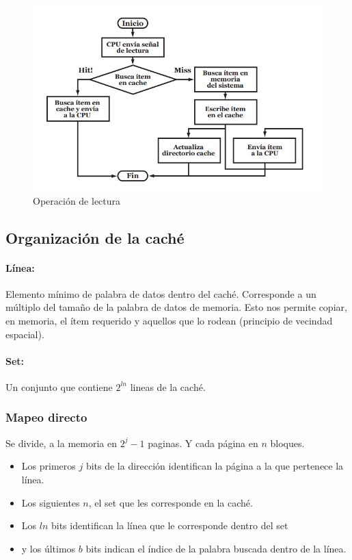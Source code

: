 \begin{figure}[ht]
	\centering
	\includegraphics[width=1\textwidth]{imagenes/cache}
	\caption{Operación de lectura}
	\label{fig:reading-operation}
\end{figure}

\subsection{Organización de la caché}

\paragraph{Línea:} Elemento mínimo de palabra de datos dentro del caché. Corresponde a un múltiplo del tamaño de la palabra de datos de memoria. Esto nos permite copiar, en memoria, el ítem requerido y aquellos que lo rodean (principio de vecindad espacial).

\paragraph{Set:} Un conjunto que contiene $2^{ln}$ lineas de la caché.

\subsubsection{Mapeo directo}
Se divide, a la memoria en $2^j - 1$ paginas. Y cada página en $n$ bloques.

\begin{itemize}
	\item Los primeros $j$ bits de la dirección identifican la página a la que pertenece la línea.
	\item Los siguientes $n$, el set que les corresponde en la caché.
	\item Los $ln$ bits identifican la línea que le corresponde dentro del set
	\item y los últimos $b$ bits indican el índice de la palabra buscada dentro de la línea.
\end{itemize}

